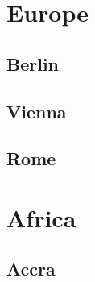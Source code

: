 \documentclass[12pt,a5paper]{article}
\begin{document}
	\section{Europe}
	\subsection{Berlin}
	\lipsum[6-8]
	\subsection{Vienna}
	\lipsum[10]
	\subsection{Rome}
	\lipsum[15]
	\section{Africa}
	\lipsum[1-4]
	\subsection{Accra}
	\lipsum[5-8]
\end{document}
